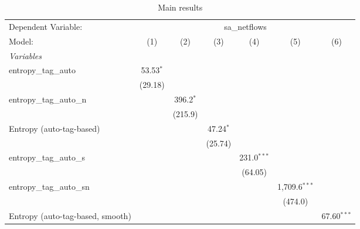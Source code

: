 
\begin{table}[htbp]
   \centering
   \caption{\label{tab:reg_sa_netflows_tag_auto.tex} Main results}
   \begin{footnotesize}
      \begin{tabular}{lcccccc}
         \tabularnewline\midrule\midrule
         Dependent Variable: & \multicolumn{6}{c}{sa\_netflows}\\
         Model:                           & (1)            & (2)            & (3)            & (4)            & (5)             & (6)\\
         \midrule \emph{Variables} &   &   &   &   &   &  \\
         entropy\_tag\_auto             & 53.53$^{*}$    &                &                &                &                 &   \\
                                          & (29.18)        &                &                &                &                 &   \\
         entropy\_tag\_auto\_n         &                & 396.2$^{*}$    &                &                &                 &   \\
                                          &                & (215.9)        &                &                &                 &   \\
         Entropy (auto-tag-based)         &                &                & 47.24$^{*}$    &                &                 &   \\
                                          &                &                & (25.74)        &                &                 &   \\
         entropy\_tag\_auto\_s         &                &                &                & 231.0$^{***}$  &                 &   \\
                                          &                &                &                & (64.05)        &                 &   \\
         entropy\_tag\_auto\_sn        &                &                &                &                & 1,709.6$^{***}$ &   \\
                                          &                &                &                &                & (474.0)         &   \\
         Entropy (auto-tag-based, smooth) &                &                &                &                &                 & 67.60$^{***}$\\

\end{tabular}
\end{footnotesize}
\end{table}

